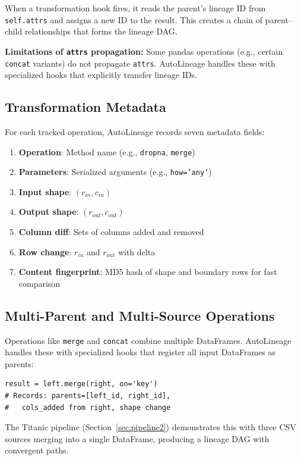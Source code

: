 \documentclass[10pt,twocolumn]{article}
\begin{document}
When a transformation hook fires, it reads the parent's lineage ID from \texttt{self.attrs} and assigns a new ID to the result. This creates a chain of parent--child relationships that forms the lineage DAG.

\textbf{Limitations of \texttt{attrs} propagation:} Some pandas operations (e.g., certain \texttt{concat} variants) do not propagate \texttt{attrs}. AutoLineage handles these with specialized hooks that explicitly transfer lineage IDs.

\subsection{Transformation Metadata}

For each tracked operation, AutoLineage records seven metadata fields:

\begin{enumerate}[leftmargin=*, nosep]
  \item \textbf{Operation}: Method name (e.g., \texttt{dropna}, \texttt{merge})
  \item \textbf{Parameters}: Serialized arguments (e.g., \texttt{how='any'})
  \item \textbf{Input shape}: $(r_{in}, c_{in})$
  \item \textbf{Output shape}: $(r_{out}, c_{out})$
  \item \textbf{Column diff}: Sets of columns added and removed
  \item \textbf{Row change}: $r_{in}$ and $r_{out}$ with delta
  \item \textbf{Content fingerprint}: MD5 hash of shape and boundary rows for fast comparison
\end{enumerate}

\subsection{Multi-Parent and Multi-Source Operations}

Operations like \texttt{merge} and \texttt{concat} combine multiple DataFrames. AutoLineage handles these with specialized hooks that register all input DataFrames as parents:

\begin{lstlisting}[numbers=none]
result = left.merge(right, on='key')
# Records: parents=[left_id, right_id],
#   cols_added from right, shape change
\end{lstlisting}

The Titanic pipeline (Section~\ref{sec:pipeline2}) demonstrates this with three CSV sources merging into a single DataFrame, producing a lineage DAG with convergent paths.
\end{document}
